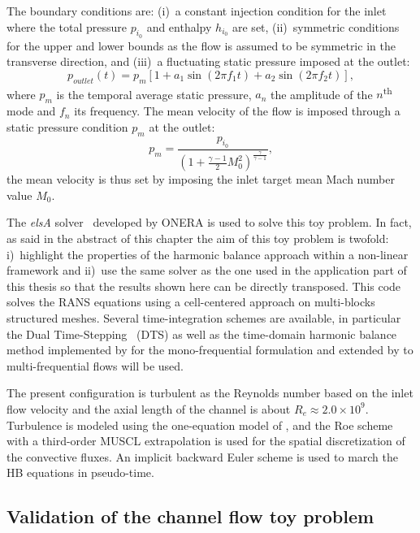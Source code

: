 The boundary conditions are: (i)~a constant injection condition for the inlet
where the total pressure $p_{i_0}$ and enthalpy $h_{i_0}$ are set,
(ii)~symmetric conditions for the upper and lower bounds as the flow
is assumed to be symmetric in the transverse direction, and (iii)~a
fluctuating static pressure imposed at the outlet:
\begin{equation}
  p_{outlet}(t) = p_m \left[1 + a_1 \sin(2 \pi f_1 t) +
    a_2 \sin(2 \pi f_2 t) \right],
  \label{eq:outlet_canal}
\end{equation}
where $p_m$ is the temporal average static pressure, $a_n$ the
amplitude of the $n$\textsuperscript{th} mode and $f_n$ its
frequency.
The mean velocity of the flow is imposed through a
static pressure condition $p_m$ at the outlet:
\begin{equation}
    p_m = \frac{p_{i_0}}{\left(1 + 
    \frac{\gamma - 1}{2} M_{0}^2 \right) ^ {\frac{\gamma}{ \gamma - 1}}} ,
\end{equation}
the mean velocity is thus set by imposing the
inlet target mean Mach number value $M_{0}$.

The \emph{elsA} solver~\cite{Cambier2013} developed by ONERA
is used to solve this toy problem. In fact, as said in the
abstract of this chapter the aim of this toy problem is 
twofold: i)~highlight the properties of the harmonic balance
approach within a non-linear framework and ii)~use the same
solver as the one used in the application part of this
thesis so that the results shown here can be directly
transposed. 
This code solves the RANS equations using a cell-centered
approach on multi-blocks structured meshes.
Several time-integration schemes
are available, in particular the Dual Time-Stepping~\cite{Jameson1981} (DTS)
as well as the time-domain harmonic 
balance method implemented by \citet{JSicot2008} for the mono-frequential
formulation and extended by \citet{JGuedeney2013} to multi-frequential flows
will be used. 


The present configuration is turbulent as the Reynolds number based on the
inlet flow velocity and the axial length of the channel is about $R_e
\approx 2.0 \times 10^9$.  Turbulence is modeled using the
one-equation model of \citet{Spalart1992}, and the
Roe scheme~\cite{Roe1981} with a third-order MUSCL extrapolation 
is used for the spatial discretization of
the convective fluxes. An implicit backward Euler scheme is used
to march the HB equations in pseudo-time.


\subsection{Validation of the channel flow toy problem}
\label{sec:channel_multifreq}

